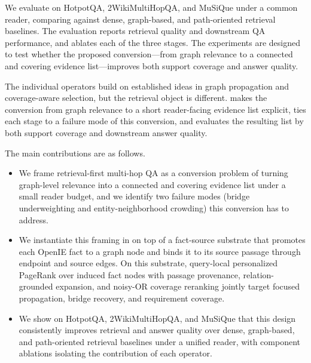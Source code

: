 We evaluate \methodname{} on HotpotQA, 2WikiMultiHopQA, and MuSiQue
under a common reader, comparing against dense, graph-based, and
path-oriented retrieval baselines. The evaluation reports retrieval
quality and downstream QA performance, and ablates each of the three
stages. The experiments are designed to test whether the proposed
conversion---from graph relevance to a connected and covering evidence
list---improves both support coverage and answer quality.

The individual operators build on established ideas in graph
propagation and coverage-aware selection, but the retrieval object is
different. \methodname{} makes the conversion from graph relevance to a
short reader-facing evidence list explicit, ties each stage to a
failure mode of this conversion, and evaluates the resulting list by
both support coverage and downstream answer quality.

The main contributions are as follows.
\begin{itemize}
    \item We frame retrieval-first multi-hop QA as a conversion
    problem of turning graph-level relevance into a connected and
    covering evidence list under a small reader budget, and we
    identify two failure modes (bridge underweighting and
    entity-neighborhood crowding) this conversion has to address.
    \item We instantiate this framing in \methodname{} on top of a
    fact-source substrate that promotes each OpenIE fact to a graph
    node and binds it to its source passage through endpoint and
    source edges. On this substrate, query-local personalized
    PageRank over induced fact nodes with passage provenance,
    relation-grounded expansion, and
    noisy-OR coverage reranking jointly target focused propagation,
    bridge recovery, and requirement coverage.
    \item We show on HotpotQA, 2WikiMultiHopQA, and MuSiQue that
    this design consistently improves retrieval and answer quality
    over dense, graph-based, and path-oriented retrieval baselines
    under a unified reader, with component ablations isolating the
    contribution of each operator.
\end{itemize}
